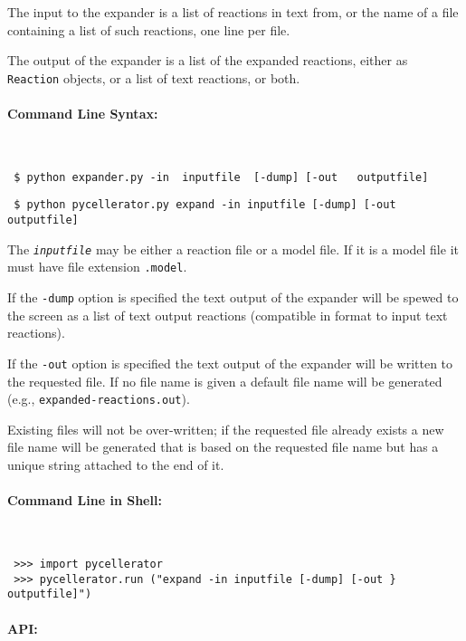 The input to the expander is a list of reactions in text from, or the name of a file containing a list of such reactions, one line per file.

The output of the expander is a list of the expanded reactions, either as {\tt Reaction} objects, or a list of text reactions, or both. 


\paragraph{Command Line Syntax:}\ 

\begin{lstlisting}
 $ python expander.py -in  inputfile  [-dump] [-out   outputfile]
\end{lstlisting}

\begin{lstlisting}
 $ python pycellerator.py expand -in inputfile [-dump] [-out  outputfile]
\end{lstlisting}


The {\tt \textit{inputfile}} may be either a reaction file or a model file. If it is a model file it must have file extension {\tt .model}. 

If the {\tt -dump} option is specified the text output of the expander will be spewed to the screen as a list
of text output reactions (compatible in format to input text reactions). 

If the {\tt -out} option is specified the text output of the expander will be written to the requested file. If no
file name is given a default file name will be generated (e.g., {\tt expanded-reactions.out}). 

Existing files will not be over-written; if the requested file already exists a new file name will be generated that is based on the requested file name but has a unique string attached to the end of it.



\paragraph{Command Line in Shell:}\ \\

 
\begin{lstlisting}
 >>> import pycellerator
 >>> pycellerator.run ("expand -in inputfile [-dump] [-out } outputfile]")
\end{lstlisting}




\paragraph{API:}

